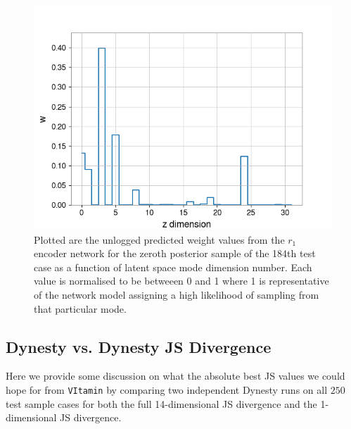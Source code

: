 %
%
\begin{figure}
    \includegraphics[width=\columnwidth]{figures/latent_weight_pub_plot_event_184.png}
    \caption[Latent space weight plot for the 184th test sample in the \texttt{VItamin} paper training set.]{\label{fig:log_weight_184} Plotted are the unlogged predicted weight values from the $r_1$ encoder network for the zeroth posterior sample of the 184th test case as a function of latent space mode dimension number. Each value is normalised to be betweeen 0 and 1 where 1 is representative of the network model assigning a high likelihood of sampling from that particular mode.}
\end{figure}


\subsection{Dynesty vs. Dynesty JS Divergence}

Here we provide some discussion on what the absolute best JS values we 
could hope for from \texttt{VItamin} by comparing two independent Dynesty 
runs on all $250$ test sample cases for both the full 14-dimensional JS 
divergence and the 1-dimensional JS divergence.
%
%

